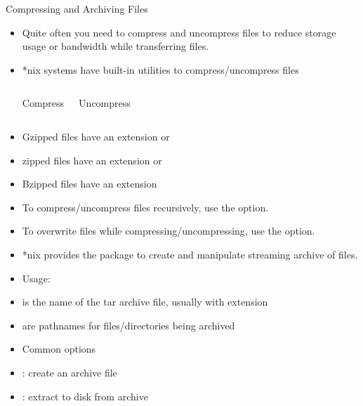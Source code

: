 \documentclass[10pt,t]{beamer}
\begin{document}
\begin{frame}{Compressing and Archiving Files}
  \begin{itemize}
    \item Quite often you need to compress and uncompress files to reduce storage usage or bandwidth while transferring files.
    \item *nix systems have built-in utilities to compress/uncompress files
      \begin{columns}
        \begin{exampleblock}{Compress}
          \\
        \end{exampleblock}
        \begin{exampleblock}{Uncompress}
          \\
        \end{exampleblock}
      \end{columns}
    \item Gzipped files have an extension  or 
    \item zipped files have an extension  or 
    \item Bzipped files have an extension 
    \item To compress/uncompress files recursively, use the  option.
    \item To overwrite files while compressing/uncompressing, use the  option.
      \framebreak
    \item *nix provides the  package to create and manipulate streaming archive of files.
    \item Usage: 
    \item[]  is the name of the tar archive file, usually with extension 
    \item[]  are pathnames for files/directories being archived
    \item Common options
    \item[] : create an archive file
    \item[] : extract to disk from archive

\end{itemize}
\end{frame}
\end{document}
